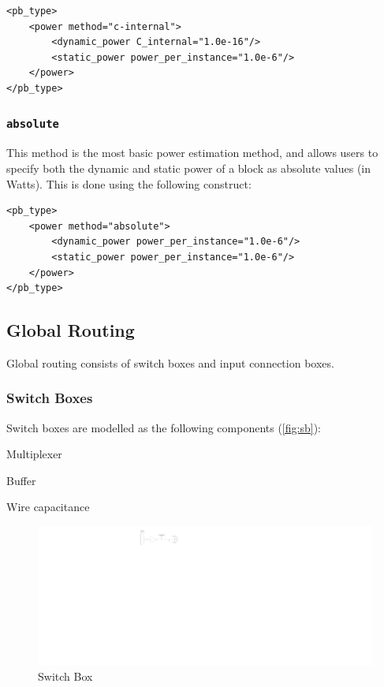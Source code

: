 \documentclass[letterpaper,twoside,10pt]{article}
\begin{document}
\begin{BVerbatim}[bgcolor=LightGray, boxwidth=\textwidth] 
<pb_type>
	<power method="c-internal">
		<dynamic_power C_internal="1.0e-16"/>
		<static_power power_per_instance="1.0e-6"/>
	</power>
</pb_type>
\end{BVerbatim}

\subsubsection{\texttt{absolute}}
This method is the most basic power estimation method, and allows users to specify both the dynamic and static power of a block as absolute values (in Watts).  This is done using the following construct:

\begin{BVerbatim}[bgcolor=LightGray, boxwidth=\textwidth] 
<pb_type>
	<power method="absolute">
		<dynamic_power power_per_instance="1.0e-6"/>
		<static_power power_per_instance="1.0e-6"/>
	</power>
</pb_type>
\end{BVerbatim}


\subsection{Global Routing}	
Global routing consists of switch boxes and input connection boxes.

\subsubsection{Switch Boxes} \label{sec:sb}
Switch boxes are modelled as the following components (\autoref{fig:sb}):
\vspace{-10pt}
\begin{enumerate*}
	\item Multiplexer 
	\item Buffer
	\item Wire capacitance
\end{enumerate*}


\begin{figure}[ht]
	\centering
		\includegraphics[scale=0.7]{images/sb.pdf}
	\caption{Switch Box}
	\label{fig:sb}
\end{figure}
\end{document}
